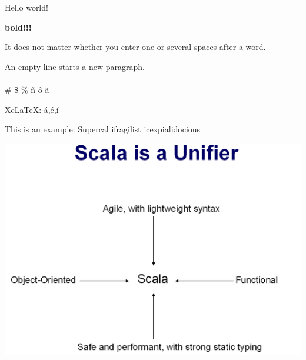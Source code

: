 \documentclass{article}
\begin{document}
Hello world!

\textbf{bold!!!}

It does not matter whether you
enter one or several             spaces
after a word.

An empty line starts a new
paragraph.
\\ \\
\# \$ \% \~n \^o \~a

XeLaTeX: á,é,í

This is an %
example: Supercal%
            ifragilist%
icexpialidocious

\includegraphics[scale=0.20]{Scala-is-a-Unifier.png}
\end{document}
